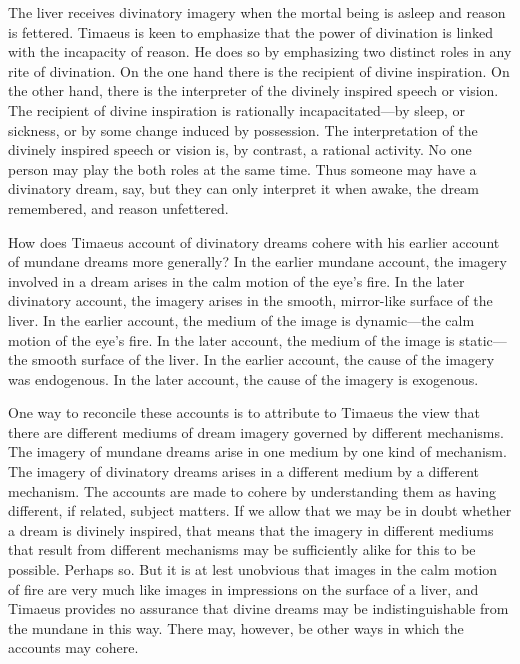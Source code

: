 The liver receives divinatory imagery when the mortal being is asleep and reason is fettered. Timaeus is keen to emphasize that the power of divination is linked with the incapacity of reason. He does so by emphasizing two distinct roles in any rite of divination. On the one hand there is the recipient of divine inspiration. On the other hand, there is the interpreter of the divinely inspired speech or vision. The recipient of divine inspiration is rationally incapacitated---by sleep, or sickness, or by some change induced by possession. The interpretation of the divinely inspired speech or vision is, by contrast, a rational activity. No one person may play the both roles at the same time. Thus someone may have a divinatory dream, say, but they can only interpret it when awake, the dream remembered, and reason unfettered.

How does Timaeus account of divinatory dreams cohere with his earlier account of mundane dreams more generally? In the earlier mundane account, the imagery involved in a dream arises in the calm motion of the eye's fire. In the later divinatory account, the imagery arises in the smooth, mirror-like surface of the liver. In the earlier account, the medium of the image is dynamic---the calm motion of the eye's fire. In the later account, the medium of the image is static---the smooth surface of the liver. In the earlier account, the cause of the imagery was endogenous. In the later account, the cause of the imagery is exogenous. 

One way to reconcile these accounts is to attribute to Timaeus the view that there are different mediums of dream imagery governed by different mechanisms. The imagery of mundane dreams arise in one medium by one kind of mechanism. The imagery of divinatory dreams arises in a different medium by a different mechanism. The accounts are made to cohere by understanding them as having different, if related, subject matters. If we allow that we may be in doubt whether a dream is divinely inspired, that means that the imagery in different mediums that result from different mechanisms may be sufficiently alike for this to be possible. Perhaps so. But it is at lest unobvious that images in the calm motion of fire are very much like images in impressions on the surface of a liver, and Timaeus provides no assurance that divine dreams may be indistinguishable from the mundane in this way. There may, however, be other ways in which the accounts may cohere. 


